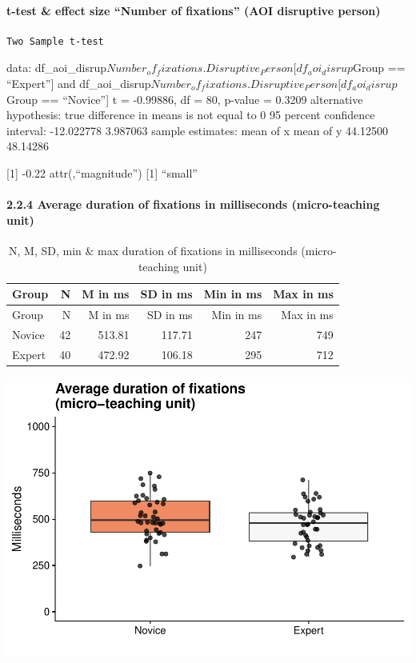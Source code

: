 \documentclass[
]{article}
\begin{document}
\paragraph{t-test \& effect size ``Number of fixations'' (AOI disruptive
person)}\label{t-test-effect-size-number-of-fixations-aoi-disruptive-person}

\begin{verbatim}
Two Sample t-test
\end{verbatim}

data:
df\_aoi\_disrup\(Number_of_fixations.Disruptive_Person[df_aoi_disrup\)Group
== ``Expert''{]} and
df\_aoi\_disrup\(Number_of_fixations.Disruptive_Person[df_aoi_disrup\)Group
== ``Novice''{]} t = -0.99886, df = 80, p-value = 0.3209 alternative
hypothesis: true difference in means is not equal to 0 95 percent
confidence interval: -12.022778 3.987063 sample estimates: mean of x
mean of y 44.12500 48.14286

{[}1{]} -0.22 attr(,``magnitude'') {[}1{]} ``small''

\paragraph{2.2.4 Average duration of fixations in milliseconds
(micro-teaching
unit)}\label{average-duration-of-fixations-in-milliseconds-micro-teaching-unit}

\begin{longtable}[]{@{}lrrrrr@{}}
\caption{N, M, SD, min \& max duration of fixations in milliseconds
(micro-teaching unit)}\tabularnewline
\toprule\noalign{}
Group & N & M in ms & SD in ms & Min in ms & Max in ms \\
\midrule\noalign{}
\endfirsthead
\toprule\noalign{}
Group & N & M in ms & SD in ms & Min in ms & Max in ms \\
\midrule\noalign{}
\endhead
\bottomrule\noalign{}
\endlastfoot
Novice & 42 & 513.81 & 117.71 & 247 & 749 \\
Expert & 40 & 472.92 & 106.18 & 295 & 712 \\
\end{longtable}

\includegraphics{expertise_2024_09_26_no_outlierdetection_MK_files/figure-latex/dur_all-1.pdf}
\end{document}
